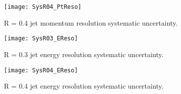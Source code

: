 {\begin{figure}
\texttt{[image: SysR04\_PtReso]}
\centering
\caption{R = 0.4 jet momentum resolution systematic uncertainty.}

\end{figure}

\begin{figure}
\texttt{[image: SysR03\_EReso]}
\centering
\caption{R = 0.3 jet energy resolution systematic uncertainty.}

\end{figure}

\begin{figure}
\texttt{[image: SysR04\_EReso]}
\centering
\caption{R = 0.4 jet energy resolution systematic uncertainty.}

\end{figure}



\clearpage
}



